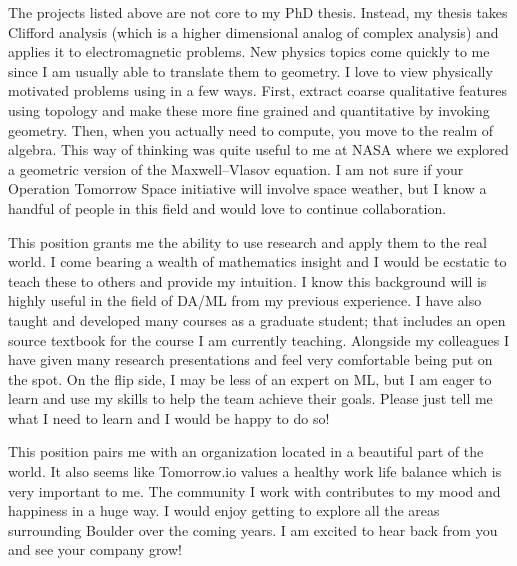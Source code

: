 \documentclass[12pt, letter]{awesome-cv}
\begin{document}
\begin{cvletter}
The projects listed above are not core to my PhD thesis. Instead, my thesis takes Clifford analysis (which is a higher dimensional analog of complex analysis) and applies it to electromagnetic problems. New physics topics come quickly to me since I am usually able to translate them to geometry. I love to view physically motivated problems using in a few ways. First, extract coarse qualitative features using topology and make these more fine grained and quantitative by invoking geometry. Then, when you actually need to compute, you move to the realm of algebra. This way of thinking was quite useful to me at NASA where we explored a geometric version of the Maxwell--Vlasov equation. I am not sure if your Operation Tomorrow Space initiative will involve space weather, but I know a handful of people in this field and would love to continue collaboration. 


This position grants me the ability to use research and apply them to the real world. I come bearing a wealth of mathematics insight and I would be ecstatic to teach these to others and provide my intuition. I know this background will is highly useful in the field of DA/ML from my previous experience. I have also taught and developed many courses as a graduate student; that includes an open source textbook for the course I am currently teaching. Alongside my colleagues I have given many research presentations and feel very comfortable being put on the spot. On the flip side, I may be less of an expert on ML, but I am eager to learn and use my skills to help the team achieve their goals. Please just tell me what I need to learn and I would be happy to do so!

This position pairs me with an organization located in a beautiful part of the world. It also seems like Tomorrow.io values a healthy work life balance which is very important to me. The community I work with contributes to my mood and happiness in a huge way. I would enjoy getting to explore all the areas surrounding Boulder over the coming years. I am excited to hear back from you and see your company grow! 

\end{cvletter}

\makeletterclosing
\end{document}
